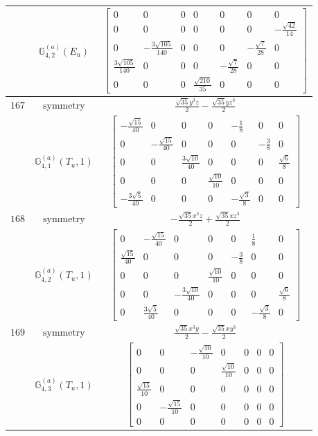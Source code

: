 \documentclass[fleqn,8pt,landscape]{jsarticle}
\begin{document}
\begin{longtable}{ccc}
$  $ & $ \mathbb{G}_{4,2}^{(a)}(E_{u}) $ & $ \begin{bmatrix} 0 & 0 & 0 & 0 & 0 & 0 & 0 \\ 0 & 0 & 0 & 0 & 0 & 0 & - \frac{\sqrt{42}}{14} \\ 0 & - \frac{3 \sqrt{105}}{140} & 0 & 0 & 0 & - \frac{\sqrt{7}}{28} & 0 \\ \frac{3 \sqrt{105}}{140} & 0 & 0 & 0 & - \frac{\sqrt{7}}{28} & 0 & 0 \\ 0 & 0 & 0 & \frac{\sqrt{210}}{35} & 0 & 0 & 0 \end{bmatrix} $ \\ \hline
$ 167 $ & $ \text{symmetry} $ & $ \frac{\sqrt{35} y^{3} z}{2} - \frac{\sqrt{35} y z^{3}}{2} $ \\
$  $ & $ \mathbb{G}_{4,1}^{(a)}(T_{u},1) $ & $ \begin{bmatrix} - \frac{\sqrt{15}}{40} & 0 & 0 & 0 & - \frac{1}{8} & 0 & 0 \\ 0 & - \frac{\sqrt{15}}{40} & 0 & 0 & 0 & - \frac{3}{8} & 0 \\ 0 & 0 & \frac{3 \sqrt{10}}{40} & 0 & 0 & 0 & \frac{\sqrt{6}}{8} \\ 0 & 0 & 0 & \frac{\sqrt{10}}{10} & 0 & 0 & 0 \\ - \frac{3 \sqrt{5}}{40} & 0 & 0 & 0 & - \frac{\sqrt{3}}{8} & 0 & 0 \end{bmatrix} $ \\ \hline
$ 168 $ & $ \text{symmetry} $ & $ - \frac{\sqrt{35} x^{3} z}{2} + \frac{\sqrt{35} x z^{3}}{2} $ \\
$  $ & $ \mathbb{G}_{4,2}^{(a)}(T_{u},1) $ & $ \begin{bmatrix} 0 & - \frac{\sqrt{15}}{40} & 0 & 0 & 0 & \frac{1}{8} & 0 \\ \frac{\sqrt{15}}{40} & 0 & 0 & 0 & - \frac{3}{8} & 0 & 0 \\ 0 & 0 & 0 & \frac{\sqrt{10}}{10} & 0 & 0 & 0 \\ 0 & 0 & - \frac{3 \sqrt{10}}{40} & 0 & 0 & 0 & \frac{\sqrt{6}}{8} \\ 0 & \frac{3 \sqrt{5}}{40} & 0 & 0 & 0 & - \frac{\sqrt{3}}{8} & 0 \end{bmatrix} $ \\ \hline
$ 169 $ & $ \text{symmetry} $ & $ \frac{\sqrt{35} x^{3} y}{2} - \frac{\sqrt{35} x y^{3}}{2} $ \\
$  $ & $ \mathbb{G}_{4,3}^{(a)}(T_{u},1) $ & $ \begin{bmatrix} 0 & 0 & - \frac{\sqrt{10}}{10} & 0 & 0 & 0 & 0 \\ 0 & 0 & 0 & \frac{\sqrt{10}}{10} & 0 & 0 & 0 \\ \frac{\sqrt{15}}{10} & 0 & 0 & 0 & 0 & 0 & 0 \\ 0 & - \frac{\sqrt{15}}{10} & 0 & 0 & 0 & 0 & 0 \\ 0 & 0 & 0 & 0 & 0 & 0 & 0 \end{bmatrix} $ \\ \hline

\end{longtable}
\end{document}
